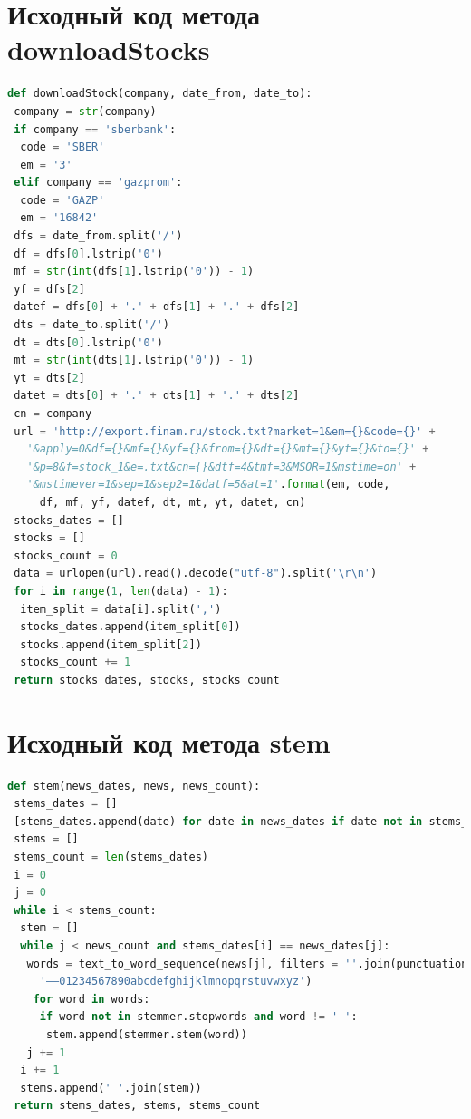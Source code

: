 \documentclass[14pt]{matmex-diploma-custom}
\begin{document}
\begin{appendices}
\section{Исходный код метода downloadStocks}

\label{code:downloadStocks}

\begin{footnotesize}
\begin{lstlisting}[language=Python]
def downloadStock(company, date_from, date_to):
 company = str(company)
 if company == 'sberbank':
  code = 'SBER'
  em = '3'
 elif company == 'gazprom':
  code = 'GAZP'
  em = '16842'
 dfs = date_from.split('/')
 df = dfs[0].lstrip('0')
 mf = str(int(dfs[1].lstrip('0')) - 1)
 yf = dfs[2]
 datef = dfs[0] + '.' + dfs[1] + '.' + dfs[2]
 dts = date_to.split('/')
 dt = dts[0].lstrip('0')
 mt = str(int(dts[1].lstrip('0')) - 1)
 yt = dts[2]
 datet = dts[0] + '.' + dts[1] + '.' + dts[2]
 cn = company
 url = 'http://export.finam.ru/stock.txt?market=1&em={}&code={}' +
   '&apply=0&df={}&mf={}&yf={}&from={}&dt={}&mt={}&yt={}&to={}' +
   '&p=8&f=stock_1&e=.txt&cn={}&dtf=4&tmf=3&MSOR=1&mstime=on' +
   '&mstimever=1&sep=1&sep2=1&datf=5&at=1'.format(em, code, 
     df, mf, yf, datef, dt, mt, yt, datet, cn)
 stocks_dates = []
 stocks = []
 stocks_count = 0
 data = urlopen(url).read().decode("utf-8").split('\r\n')
 for i in range(1, len(data) - 1):
  item_split = data[i].split(',')
  stocks_dates.append(item_split[0])
  stocks.append(item_split[2])
  stocks_count += 1
 return stocks_dates, stocks, stocks_count
\end{lstlisting}
\end{footnotesize}

\section{Исходный код метода stem}

\label{code:stem}

\begin{footnotesize}
\begin{lstlisting}[language=Python]
def stem(news_dates, news, news_count):
 stems_dates = []
 [stems_dates.append(date) for date in news_dates if date not in stems_dates]
 stems = []
 stems_count = len(stems_dates)
 i = 0
 j = 0
 while i < stems_count:
  stem = []
  while j < news_count and stems_dates[i] == news_dates[j]:
   words = text_to_word_sequence(news[j], filters = ''.join(punctuation) + 
     '–—01234567890abcdefghijklmnopqrstuvwxyz')
    for word in words:
     if word not in stemmer.stopwords and word != ' ':
      stem.append(stemmer.stem(word))
   j += 1
  i += 1
  stems.append(' '.join(stem))
 return stems_dates, stems, stems_count
\end{lstlisting}
\end{footnotesize}


\end{appendices}
\end{document}

